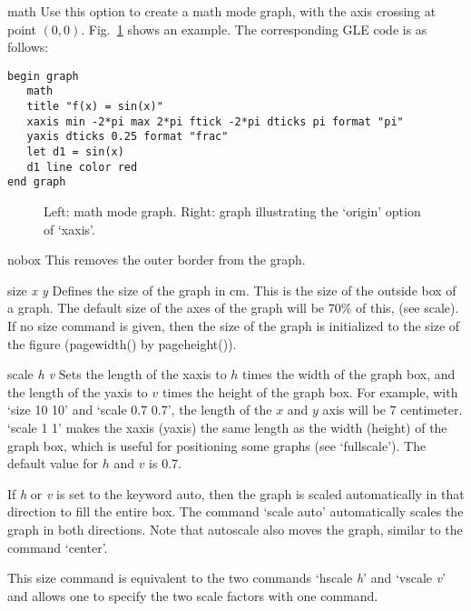 \begin{commanddescription}
\item[{\sf math}]
Use this option to create a math mode graph, with the axis crossing at point $(0,0)$. Fig.~\ref{grmath:fig} shows an example. The corresponding GLE code is as follows:

\begin{Verbatim}
begin graph
   math
   title "f(x) = sin(x)"
   xaxis min -2*pi max 2*pi ftick -2*pi dticks pi format "pi"
   yaxis dticks 0.25 format "frac"
   let d1 = sin(x)
   d1 line color red
end graph
\end{Verbatim}

\begin{figure}[tb]
\centering
\mbox{}
\caption{\label{grmath:fig}Left: math mode graph. Right: graph illustrating the `{\sf origin}' option of `{\sf xaxis}'.}
\end{figure}


\item[{\sf nobox}]
This removes the outer border from the graph.

\item[{\sf size {\it x y }}]
Defines the size of the graph in cm.  This is the size of the outside box of a graph. The default size of the axes of the graph will be 70\% of this, (see {\sf scale}). If no {\sf size} command is given, then the size of the graph is initialized to the size of the figure ({\sf pagewidth()} by {\sf pageheight()}).

\item[{\sf scale {\it h v}}]
Sets the length of the xaxis to $h$ times the width of the graph box, and the length of the yaxis to $v$ times the height of the graph box. For example, with `{\sf size 10 10}' and `{\sf scale 0.7 0.7}', the length of the $x$ and $y$ axis will be 7 centimeter. `{\sf scale 1 1}' makes the xaxis (yaxis) the same length as the width (height) of the graph box, which is useful for positioning some graphs (see `{\sf fullscale}'). The default value for $h$ and $v$ is 0.7.

If {\it h} or {\it v} is set to the keyword {\sf auto}, then the graph is scaled automatically in that direction to fill the entire box. The command `{\sf scale auto}' automatically scales the graph in both directions. Note that autoscale also moves the graph, similar to the command `{\sf center}'.

This {\sf size} command is equivalent to the two commands `{\sf hscale {\it h}}' and `{\sf vscale {\it v}}' and allows one to specify the two scale factors with one command.


\end{commanddescription}
